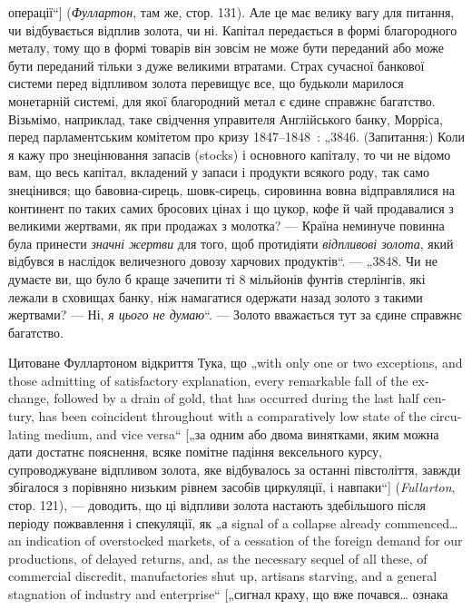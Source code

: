 операції“] (\emph{Фуллартон}, там же, стор. 131). Але це має велику
вагу для питання, чи відбувається відплив золота, чи ні. Капітал
передається в формі благородного металу, тому що в формі
товарів він зовсім не може бути переданий або може бути
переданий тільки з дуже великими втратами. Страх сучасної
банкової системи перед відпливом золота перевищує все, що
будьколи марилося монетарній системі, для якої благородний
метал є єдине справжнє багатство. Візьмімо, наприклад, таке
свідчення управителя Англійського банку, Морріса, перед парламентським
комітетом про кризу 1847--1848~: „3846. (Запитання:)
Коли я кажу про знецінювання запасів (stocks) і основного
капіталу, то чи не відомо вам, що весь капітал, вкладений у запаси
і продукти всякого роду, так само знецінився; що бавовна-сирець,
шовк-сирець, сировинна вовна відправлялися на континент
по таких самих бросових цінах і що цукор, кофе й чай продавалися
з великими жертвами, як при продажах з молотка? — Країна
неминуче повинна була принести \emph{значні жертви} для того, щоб
протидіяти \emph{відпливові золота}, який відбувся в наслідок величезного
довозу харчових продуктів“. — „3848. Чи не думаєте
ви, що було б краще зачепити ті 8 мільйонів фунтів стерлінгів, які
лежали в сховищах банку, ніж намагатися одержати назад золото
з такими жертвами? — Ні, \emph{я цього не думаю}“. — Золото вважається
тут за єдине справжнє багатство.

Цитоване Фуллартоном відкриття Тука, що „\textenglish{with only one
or two exceptions, and those admitting of satisfactory explanation,
every remarkable fall of the exchange, followed by a drain of gold,
that has occurred during the last half century, has been coincident
throughout with a comparatively low state of the circulating medium,
and vice versa}“ [„за одним або двома винятками, яким
можна дати достатнє пояснення, всяке помітне падіння вексельного
курсу, супроводжуване відпливом золота, яке відбувалось
за останні півстоліття, завжди збігалося з порівняно низьким
рівнем засобів циркуляції, і навпаки“] (\emph{Fullarton}, стор. 121), —
доводить, що ці відпливи золота настають здебільшого після періоду
пожвавлення і спекуляції, як „а signal of a collapse already
commenced\dots{} an indication of overstocked markets, of a cessation
of the foreign demand for our productions, of delayed returns, and,
as the necessary sequel of all these, of commercial discredit, manufactories
shut up, artisans starving, and a general stagnation of
industry and enterprise“ [„сигнал краху, що вже почався\dots{} ознака
\parbreak{}  %
